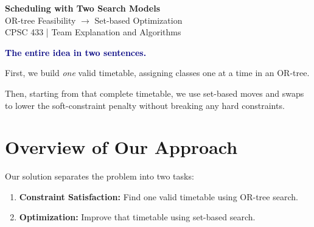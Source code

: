 \documentclass[11pt,letterpaper]{article}
\newcommand{\key}[1]{
    \textcolor{navy}{\bfseries #1}
}
\begin{document}

\begin{center}
    {\LARGE\bfseries\color{navy}
    Scheduling with Two Search Models}\\[6pt]

    {\large
    OR-tree Feasibility
    $\longrightarrow$
    Set-based Optimization}\\[7pt]

    {\small\color{muted}
    CPSC 433 | Team Explanation and Algorithms}
\end{center}

\begin{idea}
\key{The entire idea in two sentences.}

First, we build \emph{one} valid timetable,
assigning classes one at a time in an OR-tree.

Then, starting from that complete timetable,
we use set-based moves and swaps to lower the
soft-constraint penalty without breaking
any hard constraints.
\end{idea}

\section{Overview of Our Approach}

Our solution separates the problem into two tasks:

\begin{enumerate}
    \item \textbf{Constraint Satisfaction:}
    Find one valid timetable using OR-tree search.

    \item \textbf{Optimization:}
    Improve that timetable using set-based search.
\end{enumerate}
\end{document}
